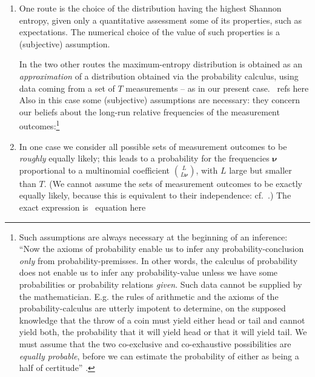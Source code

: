 \documentclass[\ifafour a4paper,12pt,\else a5paper,10pt,\fi%
onecolumn,oneside,article,%
british%
]{memoir}
\makeatletter
\theoremstyle{remark}
\theoremstyle{innote}
\def\sum{\DOTSI\sumop\slimits@}
\def\prod{\DOTSI\prodop\slimits@}
\newcommand*{\citep}{\parencites}
\newcommand*{\delt}{\deltaup}%
\newcommand*{\di}{\mathrm{d}}%
\newcommand*{\pf}{\mathrm{p}}%
\newcommand*{\p}{\mathrm{P}}%
\renewcommand*{\|}{\nonscript\,\vert\nonscript\;\mathopen{}}
\newcommand*{\sect}{\S}%
\newcommand*{\cf}{{cf.}}
\newcommand*{\tprod}{\mathop{\textstyle\prod}\nolimits}
\newcommand*{\tsum}{\mathop{\textstyle\sum}\nolimits}
\newcommand*{\puzzle}{{\fontencoding{U}\fontfamily{fontawesometwo}\selectfont\symbol{225}}}
\newcommand{\mynote}[1]{ {\color{notecolour}\puzzle\ #1}}
\newcommand*{\yAv}{A}
\newcommand*{\yff}{f}
\newcommand*{\yf}{\bm{\yff}}
\newcommand*{\yA}{\yAv}%
\newcommand*{\ynuu}{\nu}
\newcommand*{\ynu}{\bm{\ynuu}}
\makeatother
\begin{document}
\begin{enumerate}[wide,label=(\alph*)]
\item \label{item:entropy_route}One route is the choice of the distribution having the highest
  Shannon entropy, given only a quantitative assessment some of its
  properties, such as expectations. The numerical choice of the value of
  such properties is a (subjective) assumption.

  \medskip

  In the two other routes the maximum-entropy distribution is obtained as
  an \emph{approximation} of a distribution obtained via the probability
  calculus, using data coming from a set of $T$ measurements -- as in our
  present case.\mynote{refs here} Also in this case some (subjective)
  assumptions are necessary: they concern our beliefs about the long-run
  relative frequencies of the measurement outcomes:\footnote{Such
    assumptions are always necessary at the beginning of an inference:
    \enquote{Now the axioms of probability enable us to infer any
      probability-conclusion \emph{only} from probability-premisses. In
      other words, the calculus of probability does not enable us to infer
      any probability-value unless we have some probabilities or
      probability relations \emph{given}. Such data cannot be supplied by
      the mathematician. E.g. the rules of arithmetic and the axioms of the
      probability-calculus are utterly impotent to determine, on the
      supposed knowledge that the throw of a coin must yield either head or
      tail and cannot yield both, the probability that it will yield head
      or that it will yield tail. We must assume that the two co-exclusive
      and co-exhaustive possibilities are \emph{equally probable}, before
      we can estimate the probability of either as being a half of
      certitude} \citep[\emph{Appendix on eduction}, \sect~5,
    p.~182]{johnson1924}.}

\item \label{item:entr_prior_route}In one case we consider all possible
  sets of measurement outcomes to be \emph{roughly} equally likely; this
  leads to a probability for the frequencies $\ynu$ proportional to a
  multinomial coefficient $\binom{L}{L\ynu}$, with $L$ large but smaller
  than $T$. (We cannot assume the sets of measurement outcomes to be
  exactly equally likely, because this is equivalent to their independence:
  \cf\
  \cites[\sect~6.7]{jaynes1994_r2003}[\sect~B]{portamana2009}[\sect~2]{portamana2017}.)
  The exact expression is\mynote{equation here}


\end{enumerate}
\end{document}
